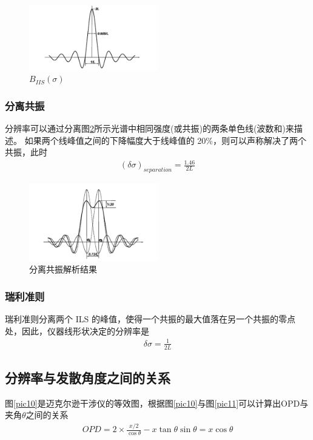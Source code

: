 \documentclass[conference]{IEEEtran}
\begin{document}
\begin{figure}[htbp]
    \centerline{\includegraphics[width=0.5\textwidth]{pic8.png}}
    \caption{$B_{I I S}(\sigma)$}
    \label{pic8}
\end{figure}

\subsubsection{分离共振}
分辨率可以通过分离图\ref{pic9}所示光谱中相同强度(或共振)的两条单色线(波数和)来描述。
如果两个线峰值之间的下降幅度大于线峰值的 20\%，则可以声称解决了两个共振，此时
\begin{align}
    (\delta \sigma)_{separation} = \frac{1.46}{2L}
\end{align}

\begin{figure}[htbp]
    \centerline{\includegraphics[width=0.5\textwidth]{pic9.png}}
    \caption{分离共振解析结果}
    \label{pic9}
\end{figure}

\subsubsection{瑞利准则}
瑞利准则分离两个 ILS 的峰值，使得一个共振的最大值落在另一个共振的零点处，因此，仪器线形状决定的分辨率是
\begin{align}
    \delta \sigma = \frac{1}{2L}
\end{align} 

\subsection{分辨率与发散角度之间的关系}
图\ref{pic10}是迈克尔逊干涉仪的等效图，根据图\ref{pic10}与图\ref{pic11}可以计算出OPD与夹角$\theta$之间的关系
\begin{align}
    O P D=2 \times \frac{x / 2}{\cos \theta}-x \tan \theta \sin \theta=x \cos \theta
\end{align}
\end{document}
